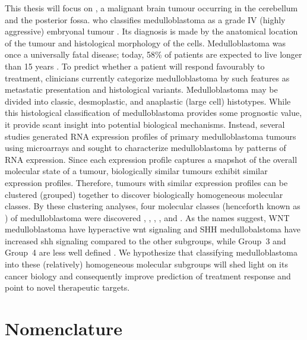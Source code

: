 This thesis will focus on , a malignant brain tumour occurring in the cerebellum and the posterior fossa. \gls{who} classifies medulloblastoma as a grade IV (highly aggressive) embryonal tumour . Its diagnosis is made by the anatomical location of the tumour and histological morphology of the cells. Medulloblastoma was once a universally fatal disease; today, 58\% of patients are expected to live longer than 15 years . To predict whether a patient will respond favourably to treatment, clinicians currently categorize medulloblastoma by such features as metastatic presentation and histological variants. Medulloblastoma may be divided into classic, desmoplastic, and anaplastic (large cell) histotypes. While this histological classification of medulloblastoma provides some prognostic value, it provide scant insight into potential biological mechanisms. Instead, several studies generated RNA expression profiles of primary medulloblastoma tumours using microarrays and sought to characterize medulloblastoma by patterns of RNA expression. Since each expression profile captures a snapshot of the overall molecular state of a tumour, biologically similar tumours exhibit similar expression profiles. Therefore, tumours with similar expression profiles can be clustered (grouped) together to discover biologically homogeneous molecular classes. By these clustering analyses, four molecular classes (henceforth known as ) of medulloblastoma were discovered , , , , and . As the names suggest, WNT medulloblastoma have hyperactive \gls{wnt} signaling and SHH medullobalstoma have increased \gls{shh} signaling compared to the other subgroups, while Group~3 and Group~4 are less well defined . We hypothesize that classifying medulloblastoma into these (relatively) homogeneous molecular subgroups will shed light on its cancer biology and consequently improve prediction of treatment response and point to novel therapeutic targets.


\section{Nomenclature}

